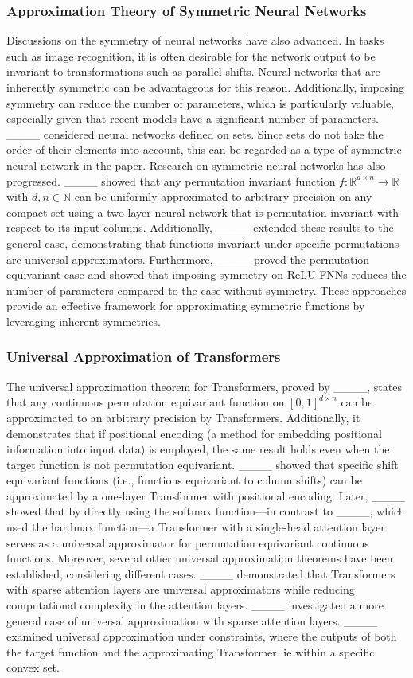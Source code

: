\subsubsection{Approximation Theory of Symmetric Neural Networks}
Discussions on the symmetry of neural networks have also advanced. In tasks such as image recognition, it is often desirable for the network output to be invariant to transformations such as parallel shifts. Neural networks that are inherently symmetric can be advantageous for this reason. Additionally, imposing symmetry can reduce the number of parameters, which is particularly valuable, especially given that recent models have a significant number of parameters.  
____ considered neural networks defined on sets. Since sets do not take the order of their elements into account, this can be regarded as a type of symmetric neural network in the paper. Research on symmetric neural networks has also progressed. ____ showed that any permutation invariant function \( f: \mathbb{R}^{d \times n} \to \mathbb{R} \) with \( d, n \in \mathbb{N} \) can be uniformly approximated to arbitrary precision on any compact set using a two-layer neural network that is permutation invariant with respect to its input columns. Additionally, ____ extended these results to the general case, demonstrating that functions invariant under specific permutations are universal approximators. Furthermore, ____ proved the permutation equivariant case and showed that imposing symmetry on ReLU FNNs reduces the number of parameters compared to the case without symmetry. These approaches provide an effective framework for approximating symmetric functions by leveraging inherent symmetries.

\subsubsection{Universal Approximation of Transformers}
The universal approximation theorem for Transformers, proved by ____, states that any continuous permutation equivariant function on $[0,1]^{d \times n}$ can be approximated to an arbitrary precision by Transformers. Additionally, it demonstrates that if positional encoding (a method for embedding positional information into input data) is employed, the same result holds even when the target function is not permutation equivariant. ____ showed that specific shift equivariant functions (i.e., functions equivariant to column shifts) can be approximated by a one-layer Transformer with positional encoding. Later, ____ showed that by directly using the softmax function—in contrast to ____, which used the hardmax function—a Transformer with a single-head attention layer serves as a universal approximator for permutation equivariant continuous functions. Moreover, several other universal approximation theorems have been established, considering different cases. ____ demonstrated that Transformers with sparse attention layers are universal approximators while reducing computational complexity in the attention layers. ____ investigated a more general case of universal approximation with sparse attention layers. ____ examined universal approximation under constraints, where the outputs of both the target function and the approximating Transformer lie within a specific convex set.

